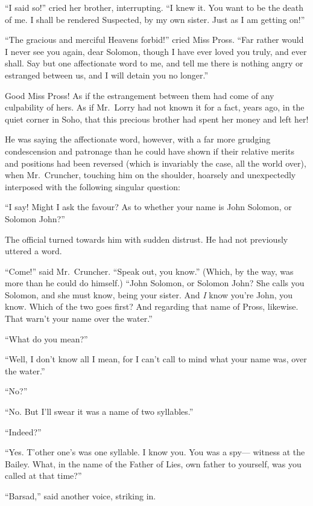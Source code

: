 ``I said so!'' cried her brother, interrupting.  ``I knew it.  You want
to be the death of me.  I shall be rendered Suspected, by my own
sister.  Just as I am getting on!''

``The gracious and merciful Heavens forbid!'' cried Miss Pross.  ``Far
rather would I never see you again, dear Solomon, though I have ever
loved you truly, and ever shall.  Say but one affectionate word to
me, and tell me there is nothing angry or estranged between us, and I
will detain you no longer.''

Good Miss Pross!  As if the estrangement between them had come of any
culpability of hers.  As if Mr.\ Lorry had not known it for a fact,
years ago, in the quiet corner in Soho, that this precious brother
had spent her money and left her!

He was saying the affectionate word, however, with a far more
grudging condescension and patronage than he could have shown if
their relative merits and positions had been reversed (which is
invariably the case, all the world over), when Mr.\ Cruncher, touching
him on the shoulder, hoarsely and unexpectedly interposed with the
following singular question:

``I say!  Might I ask the favour?  As to whether your name is John
Solomon, or Solomon John?''

The official turned towards him with sudden distrust.  He had not
previously uttered a word.

``Come!'' said Mr.\ Cruncher.  ``Speak out, you know.''  (Which, by the
way, was more than he could do himself.) ``John Solomon, or Solomon
John?  She calls you Solomon, and she must know, being your sister.
And \emph{I} know you're John, you know. Which of the two goes first?
And regarding that name of Pross, likewise.  That warn't your name
over the water.''

``What do you mean?''

``Well, I don't know all I mean, for I can't call to mind what your
name was, over the water.''

``No?''

``No.  But I'll swear it was a name of two syllables.''

``Indeed?''

``Yes.  T'other one's was one syllable.  I know you.  You was a spy---%
witness at the Bailey.  What, in the name of the Father of Lies,
own father to yourself, was you called at that time?''

``Barsad,'' said another voice, striking in.

